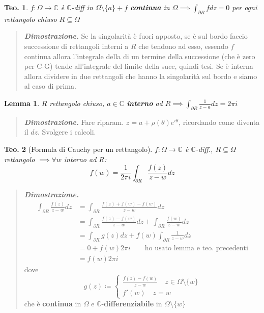 \documentclass[a4paper,10pt]{article}
\newcommand{\im}{\mathbb{C}} %
\theoremstyle{indentdefinition}
\theoremstyle{indenttheorem}
\newtheorem{thm}{Teo.}
\newtheorem{lem}{Lemma}
\theoremstyle{myremark}
\theoremstyle{indentgeneral}
\newenvironment{dimo}{\begin{quote}\textit{\textbf{Dimostrazione.}}}{\end{quote}} %
\begin{document}
\begin{thm}
    $f:\Omega\to\im$ è $\im$-diff in $\Omega \setminus \{a\} + f$ \textbf{continua} in $\Omega\implies \int_{\partial R}fdz=0$ per ogni rettangolo chiuso $R\subseteq \Omega$
\end{thm}

\begin{dimo}
    Se la singolarità è fuori apposto, se è sul bordo faccio successione di rettangoli interni a $R$ che tendono ad esso, essendo $f$ continua allora l'integrale della di un termine della  successione (che è zero per  C-G) tende all'integrale del limite della succ, quindi tesi. Se è interna allora dividere in due rettangoli che hanno la singolarità sul bordo e siamo al caso  di prima.
\end{dimo}

\begin{lem}
    $R$ rettangolo chiuso, $a\in\im$  \textbf{interno} ad $R \implies \int_{\partial R}\frac{1}{z-a}dz=2\pi i$
\end{lem}

\begin{dimo}
    Fare riparam. $z=a+\rho(\theta)e^{i\theta}$, ricordando come diventa il $dz$. Svolgere i calcoli.
\end{dimo}

\begin{thm}[Formula di Cauchy per un rettangolo]
$f:\Omega\to\im$ è $\im$-diff., $R\subseteq \Omega$ rettangolo $\implies\forall w$ interno ad $R$: $$f(w)=\frac{1}{2\pi i}\int_{\partial R}\frac{f(z)}{z-w}dz$$
\end{thm}

\begin{dimo}
\begin{align*}
     \int_{\partial R}\frac{f(z)}{z-w}dz &=\int_{\partial R}\frac{f(z)+f(w)-f(w)}{z-w}dz \\ &=
     \int_{\partial R}\frac{f(z)-f(w)}{z-w}dz + \int_{\partial R}\frac{f(w)}{z-w}dz \\&= 
     \int_{\partial R}g(z)dz+f(w)\int_{\partial R}\frac{1}{z-w}dz \\ &= 
     0+f(w)2\pi i \quad \quad \text{ho usato lemma e teo. precedenti}\\ &
     =f(w)2\pi i
\end{align*}
dove 
$$g(z)\coloneqq 
\begin{cases}
\frac{f(z)-f(w)}{z-w} \quad z\in\Omega\setminus\{w\} \\
f'(w) \quad z=w
\end{cases}$$
che è \textbf{continua} in $\Omega$ e $\im$-\textbf{differenziabile} in $\Omega\setminus\{w\}$
   
\end{dimo}
\end{document}
